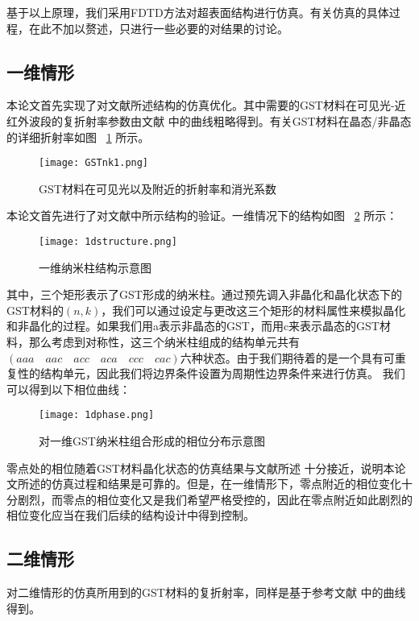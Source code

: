 基于以上原理，我们采用FDTD方法对超表面结构进行仿真。有关仿真的具体过程，在此不加以赘述，只进行一些必要的对结果的讨论。

\subsection{一维情形}
\label{subsec:onedim}
本论文首先实现了对文献所述结构的仿真优化。其中需要的GST材料在可见光-近红外波段的复折射率参数由文献 \cite{GSTnk} 中的曲线粗略得到。有关GST材料在晶态/非晶态的详细折射率如图 ~\ref{fig:nkGST} 所示。
\begin{figure}[H] %
  \centering
  \texttt{[image: GSTnk1.png]} \cite{GSTnk}
  \caption{GST材料在可见光以及附近的折射率和消光系数}
  \label{fig:nkGST}
\end{figure}

本论文首先进行了对文献中所示结构的验证。一维情况下的结构如图 ~\ref{fig:dstructure} 所示：
\begin{figure}[H] %
  \centering
  \texttt{[image: 1dstructure.png]}
  \caption{一维纳米柱结构示意图}
  \label{fig:dstructure}
\end{figure}

其中，三个矩形表示了GST形成的纳米柱。通过预先调入非晶化和晶化状态下的GST材料的$\left (n,k \right )$，我们可以通过设定与更改这三个矩形的材料属性来模拟晶化和非晶化的过程。如果我们用a表示非晶态的GST，而用c来表示晶态的GST材料，那么考虑到对称性，这三个纳米柱组成的结构单元共有$\left (aaa \quad aac \quad acc \quad aca \quad ccc \quad cac \right )$六种状态。由于我们期待着的是一个具有可重复性的结构单元，因此我们将边界条件设置为周期性边界条件来进行仿真。
我们可以得到以下相位曲线：
\begin{figure}[H] %
  \centering
  \texttt{[image: 1dphase.png]}
  \caption{对一维GST纳米柱组合形成的相位分布示意图}
  \label{fig:1dphase}
\end{figure}
零点处的相位随着GST材料晶化状态的仿真结果与文献所述 \cite{metaGST} 十分接近，说明本论文所述的仿真过程和结果是可靠的。但是，在一维情形下，零点附近的相位变化十分剧烈，而零点的相位变化又是我们希望严格受控的，因此在零点附近如此剧烈的相位变化应当在我们后续的结构设计中得到控制。

\subsection{二维情形}
\label{subsec:twodim}
对二维情形的仿真所用到的GST材料的复折射率，同样是基于参考文献 \cite{GSTnk} 中的曲线得到。

